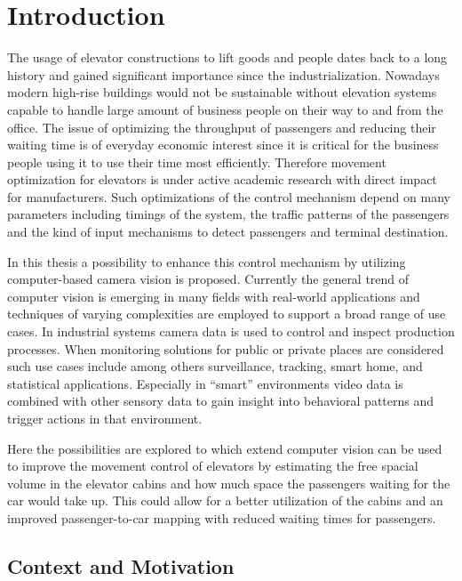 \chapter{Introduction}
\label{chap:intro}

The usage of elevator constructions to lift goods and people dates back to a long history and gained significant importance since the industrialization.
Nowadays modern high-rise buildings would not be sustainable without elevation systems capable to handle large amount of business people on their way to and from the office. 
The issue of optimizing the throughput of passengers and reducing their waiting time is of everyday economic interest since it is critical for the business people using it to use their time most efficiently. 
Therefore movement optimization for elevators is under active academic research with direct impact for manufacturers.
Such optimizations of the control mechanism depend on many parameters including timings of the system, the traffic patterns of the passengers and the kind of input mechanisms to detect passengers and terminal destination.

In this thesis a possibility to enhance this control mechanism by utilizing computer-based camera vision is proposed.
Currently the general trend of computer vision is emerging in many fields with real-world applications
and techniques of varying complexities are employed to support a broad range of use cases. 
In industrial systems camera data is used to control and inspect production processes. 
When monitoring solutions for public or private places are considered such use cases include among others surveillance, tracking,
smart home, and statistical applications.
Especially in \enquote{smart} environments video data is combined with other sensory data to gain insight into behavioral patterns and trigger actions in that environment.

Here the possibilities are explored to which extend
computer vision can be used to improve the movement control of elevators by estimating the free spacial volume in the elevator cabins and how much space the passengers waiting for the car would take up.
This could allow for a better utilization of the cabins and an improved passenger-to-car mapping with reduced waiting times for passengers.

\section{Context and Motivation}

